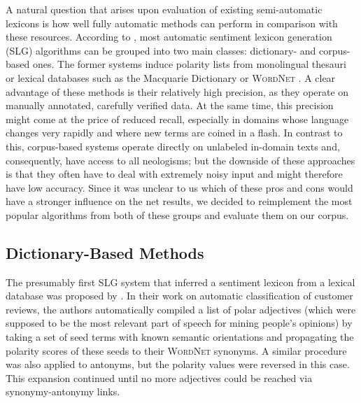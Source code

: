 A natural question that arises upon evaluation of existing
semi-automatic lexicons is how well fully automatic methods can
perform in comparison with these resources.  According to
\citet[p. 79]{Liu:12}, most automatic sentiment lexicon generation
(SLG) algorithms can be grouped into two main classes: dictionary- and
corpus-based ones.  The former systems induce polarity lists from
monolingual thesauri or lexical databases such as the Macquarie
Dictionary \cite{Bernard:86} or \textsc{WordNet} \cite{Miller:95}.  A
clear advantage of these methods is their relatively high precision,
as they operate on manually annotated, carefully verified data.  At
the same time, this precision might come at the price of reduced
recall, especially in domains whose language changes very rapidly and
where new terms are coined in a flash.  In contrast to this,
corpus-based systems operate directly on unlabeled in-domain texts
and, consequently, have access to all neologisms; but the downside of
these approaches is that they often have to deal with extremely noisy
input and might therefore have low accuracy.  Since it was unclear to
us which of these pros and cons would have a stronger influence on the
net results, we decided to reimplement the most popular algorithms
from both of these groups and evaluate them on our corpus.

\subsection{Dictionary-Based Methods}

The presumably first SLG system that inferred a sentiment lexicon from
a lexical database was proposed by \citet{Hu:04}.  In their work on
automatic classification of customer reviews, the authors
automatically compiled a list of polar adjectives (which were supposed
to be the most relevant part of speech for mining people's opinions)
by taking a set of seed terms with known semantic orientations and
propagating the polarity scores of these seeds to their
\textsc{WordNet} synonyms.  A similar procedure was also applied to
antonyms, but the polarity values were reversed in this case.  This
expansion continued until no more adjectives could be reached via
synonymy-antonymy links.

